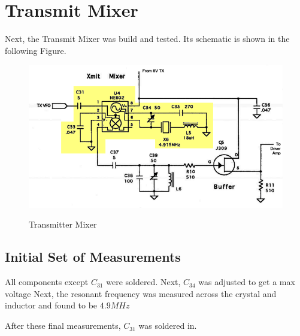 \section{Transmit Mixer}

Next, the Transmit Mixer was build and tested. Its schematic is shown in the
following Figure. 

\begin{figure}[h!]
  \centering
  \includegraphics[scale=0.4]{./img/txmix.png}
\label{txmix}
\caption{Transmitter Mixer}
\end{figure}

\subsection{Initial Set of Measurements}

All components except $C_{31}$ were soldered. Next, $C_{34}$ was adjusted to get a
max voltage %
Next, the resonant frequency was measured across the crystal and inductor and
found to be $\boxed{4.9MHz}$


After these final measurements, $C_{31}$ was soldered in.
